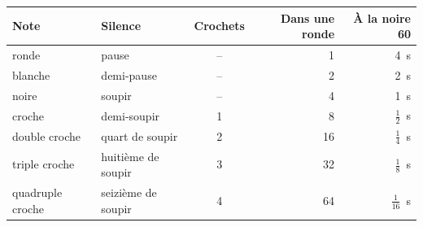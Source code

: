 
\begin{tabular}{@{}l l c r r@{}}
\toprule
\textbf{Note} & \textbf{Silence} & \textbf{Crochets} & \textbf{Dans une ronde} & \textbf{À la noire 60} \\
\midrule
ronde & pause & -- & 1 & 4~s \\
blanche & demi-pause & -- & 2 & 2~s \\
noire & soupir & -- & 4 & 1~s \\
croche & demi-soupir & 1 & 8 & $\frac{1}{2}$~s \\
double croche & quart de soupir & 2 & 16 & $\frac{1}{4}$~s \\
triple croche & huitième de soupir & 3 & 32 & $\frac{1}{8}$~s \\
quadruple croche & seizième de soupir & 4 & 64 & $\frac{1}{16}$~s \\
\bottomrule
\end{tabular}
